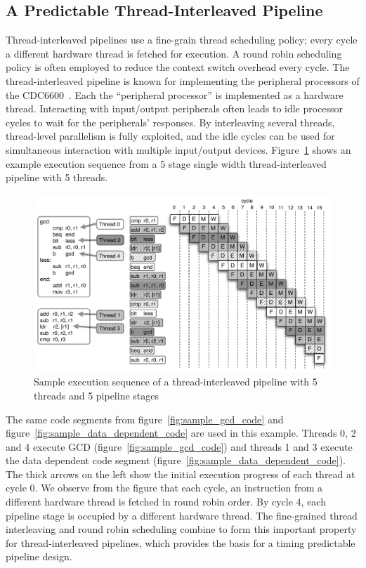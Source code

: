 \subsection{A Predictable Thread-Interleaved Pipeline}
\label{section:pret_thread_pipeline}
Thread-interleaved pipelines use a fine-grain thread scheduling policy; every cycle a different hardware thread is fetched for execution.
A round robin scheduling policy is often employed to reduce the context switch overhead every cycle.     
The thread-interleaved pipeline is known for implementing the peripheral processors of the CDC6600~\cite{CDC6600}.
Each the ``peripheral processor'' is implemented as a hardware thread.     
Interacting with input/output peripherals often leads to idle processor cycles to wait for the peripherals' responses.
By interleaving several threads, thread-level parallelism is fully exploited, and the idle cycles can be used for simultaneous interaction with multiple input/output devices.       
Figure~\ref{fig:execution_thread_interleaved_pipeline} shows an example execution sequence from a 5 stage single width thread-interleaved pipeline with 5 threads.
\begin{figure}[h]
    \begin{center}
    \includegraphics[scale=.55]{figs/thread-interleaved-execution}
  \end{center}
  \vspace{-10pt}
  \caption{Sample execution sequence of a thread-interleaved pipeline with 5 threads and 5 pipeline stages}
  \label{fig:execution_thread_interleaved_pipeline}
\end{figure}

The same code segments from figure~\ref{fig:sample_gcd_code} and figure~\ref{fig:sample_data_dependent_code} are used in this example. 
Threads 0, 2 and 4 execute GCD (figure~\ref{fig:sample_gcd_code}) and threads 1 and 3 execute the data dependent code segment (figure~\ref{fig:sample_data_dependent_code}).
The thick arrows on the left show the initial execution progress of each thread at cycle 0.
We observe from the figure that each cycle, an instruction from a different hardware thread is fetched in round robin order.
By cycle 4, each pipeline stage is occupied by a different hardware thread.
The fine-grained thread interleaving and round robin scheduling combine to form this important property for thread-interleaved pipelines, which provides the basis for a timing predictable pipeline design.

